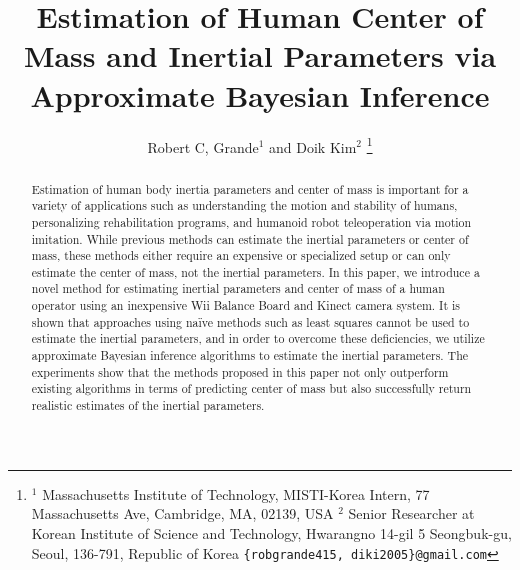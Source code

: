 \documentclass[letterpaper, 10 pt, conference]{ieeeconf}  %
\title{\LARGE \bf
Estimation of Human Center of Mass and Inertial Parameters via Approximate Bayesian Inference
}
\author{Robert C, Grande$^{1}$ and Doik Kim$^{2}$%
\thanks{$^{1}$ Massachusetts Institute of Technology, MISTI-Korea Intern, 77 Massachusetts Ave, Cambridge, MA, 02139, USA $^{2}$ Senior Researcher at Korean Institute of Science and Technology, Hwarangno 14-gil 5
Seongbuk-gu, Seoul, 136-791, Republic of Korea
        {\tt\small \{robgrande415, diki2005\}@gmail.com}}%
}
\theoremstyle{plain} \theorembodyfont{\upshape}
\begin{document}
\maketitle
\thispagestyle{empty}
\pagestyle{empty}


\begin{abstract}
Estimation of human body inertia parameters and center of mass is important for a variety of applications such as understanding the motion and stability of humans, personalizing rehabilitation programs, and humanoid robot teleoperation via motion imitation.
While previous methods can estimate the inertial parameters or center of mass, these methods either require an expensive or specialized setup or can only estimate the center of mass, not the inertial parameters.
In this paper, we introduce a novel method for estimating inertial parameters and center of mass of a human operator using an inexpensive Wii Balance Board and Kinect camera system. 
It is shown that approaches using na\"ive methods such as least squares cannot be used to estimate the inertial parameters, and in order to overcome these deficiencies, we utilize approximate Bayesian inference algorithms to estimate the inertial parameters. 
The experiments show that the methods proposed in this paper not only outperform existing algorithms in terms of predicting center of mass but also successfully return realistic estimates of the inertial parameters.
\end{abstract}
\end{document}
